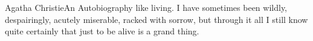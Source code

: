 %

\cleardoublepage
\thispagestyle{empty}


\begin{vplace}[2]
\begin{epiquote}{Agatha Christie}{An Autobiography}
    \lettrine[lraise=0.05,findent=1pt,nindent=2pt]{\normalfont{}}{} %
    like living. I have sometimes been wildly, despairingly, acutely miserable, racked with sorrow, but through it all I still know quite certainly that just to be alive is a grand thing.%
\end{epiquote}
\end{vplace}

\clearpage
